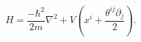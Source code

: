 \begin{equation}
H=\frac{-\hbar^{2}}{2m}\nabla^{2}+V\left(  x^{i}+\frac{\theta^{ij}\partial
_{j}}{2}\right)  .\label{28}%
\end{equation}

